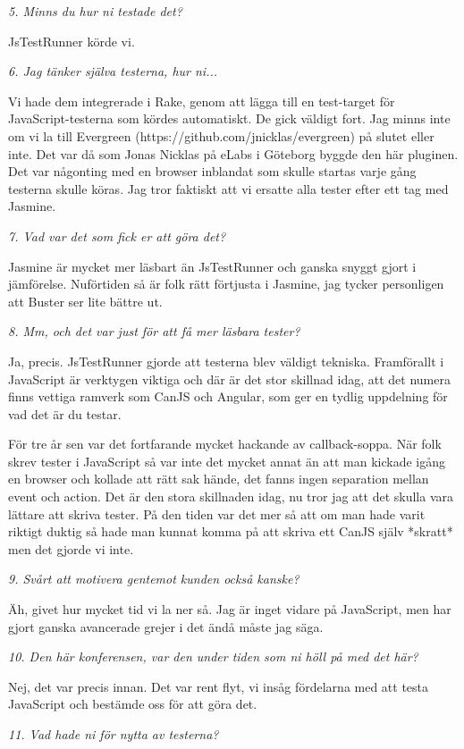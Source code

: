\documentclass[11pt]{article}
\begin{document}
\emph{5. Minns du hur ni testade det?}

JsTestRunner körde vi.

\emph{6. Jag tänker själva testerna, hur ni...}

Vi hade dem integrerade i Rake, genom att lägga till en test-target för JavaScript-testerna som kördes automatiskt. De gick väldigt fort. Jag minns inte om vi la till Evergreen (https://github.com/jnicklas/evergreen) på slutet eller inte. Det var då som Jonas Nicklas på eLabs i Göteborg byggde den här pluginen. Det var någonting med en browser inblandat som skulle startas varje gång testerna skulle köras. Jag tror faktiskt att vi ersatte alla tester efter ett tag med Jasmine.

\emph{7. Vad var det som fick er att göra det?}

Jasmine är mycket mer läsbart än JsTestRunner och ganska snyggt gjort i jämförelse. Nuförtiden så är folk rätt förtjusta i Jasmine, jag tycker personligen att Buster ser lite bättre ut.

\emph{8. Mm, och det var just för att få mer läsbara tester?}

Ja, precis. JsTestRunner gjorde att testerna blev väldigt tekniska. Framförallt i JavaScript är verktygen viktiga och där är det stor skillnad idag, att det numera finns vettiga ramverk som CanJS och Angular, som ger en tydlig uppdelning för vad det är du testar.

För tre år sen var det fortfarande mycket hackande av callback-soppa. När folk skrev tester i JavaScript så var inte det mycket annat än att man kickade igång en browser och kollade att rätt sak hände, det fanns ingen separation mellan event och action. Det är den stora skillnaden idag, nu tror jag att det skulla vara lättare att skriva tester. På den tiden var det mer så att om man hade varit riktigt duktig så hade man kunnat komma på att skriva ett CanJS själv *skratt* men det gjorde vi inte.

\emph{9. Svårt att motivera gentemot kunden också kanske?}

Äh, givet hur mycket tid vi la ner så. Jag är inget vidare på JavaScript, men har gjort ganska avancerade grejer i det ändå måste jag säga.

\emph{10. Den här konferensen, var den under tiden som ni höll på med det här?}

Nej, det var precis innan. Det var rent flyt, vi insåg fördelarna med att testa JavaScript och bestämde oss för att göra det.

\emph{11. Vad hade ni för nytta av testerna?}
\end{document}
